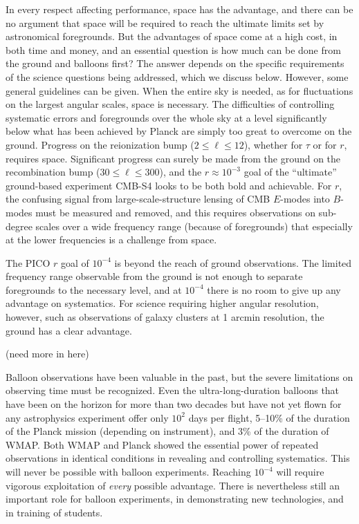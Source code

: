 \documentclass[PICOReport.tex]{subfiles}
\begin{document}
In every respect affecting performance, space has the advantage, and there can be no argument that space will be required to reach the ultimate limits set by astronomical foregrounds.  But the advantages of space come at a high cost, in both time and money, and an essential question is how much can be done from the ground and balloons first?  The answer depends on the specific requirements of the science questions being addressed, which we discuss below. However, some general guidelines can be given.  When the entire sky is needed, as for fluctuations on the largest angular scales, space is necessary.  The difficulties of controlling systematic errors and foregrounds over the whole sky at a level significantly below what has been achieved by Planck are simply too great to overcome on the ground.  Progress on the reionization bump ($2\leq \ell \leq 12$), whether for $\tau$ or for $r$, requires space.  Significant progress can surely be made from the ground on the recombination bump ($30 \leq \ell \leq 300$), and the $r \approx 10^{-3}$ goal of the ``ultimate'' ground-based experiment CMB-S4 looks to be both bold and achievable.  For $r$, the confusing signal from large-scale-structure lensing of CMB $E$-modes into $B$-modes must be measured and removed, and this requires observations on sub-degree scales over a wide frequency range (because of foregrounds) that especially at the lower frequencies is a challenge from space.

The PICO $r$ goal of $10^{-4}$ is beyond the reach of ground observations.  The limited frequency range observable from the ground is not enough to separate foregrounds to the necessary level, and at $10^{-4}$ there is no room to give up any advantage on systematics.  For science requiring higher angular resolution, however, such as observations of galaxy clusters at 1 arcmin resolution, the ground has a clear advantage.

(need more in here)

Balloon observations have been valuable in the past, but the severe limitations on observing time must be recognized.  Even the ultra-long-duration balloons that have been on the horizon for more than two decades but have not yet flown for any astrophysics experiment offer only $10^2$ days per flight, 5--10\% of the duration of the Planck mission (depending on instrument), and 3\% of the duration of WMAP.  Both WMAP and Planck showed the essential power of repeated observations in identical conditions in revealing and controlling systematics.  This will never be possible with balloon experiments.  Reaching $10^{-4}$ will require vigorous exploitation of {\it every\/} possible advantage.  There is nevertheless still an important role for balloon experiments, in demonstrating new technologies, and in training of students.
\end{document}
